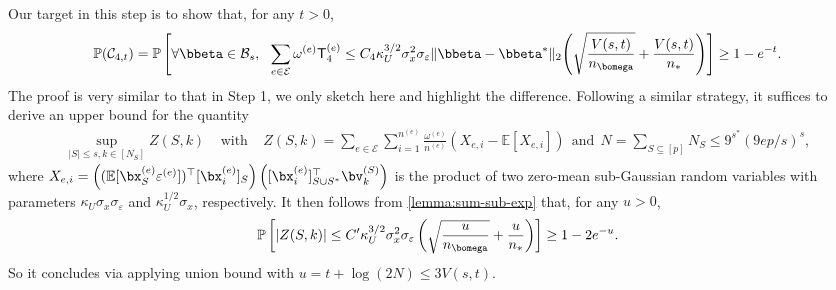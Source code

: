 \documentclass[10pt]{article}
\numberwithin{equation}{section}
\begin{document}
 Our target in this step is to show that, for any $t>0$,
\begin{align}
\label{eq:low-dim-id-bound4}
\mathbb{P}(\mathcal{C}_{4,t}) = \mathbb{P}\left[\forall \bbeta \in \mathcal{B}_s, ~~ \sum_{e\in \mathcal{E}} \omega^{(e)} \mathsf{T}_4^{(e)} \le C_4 \kappa_U^{3/2} \sigma_x^2\sigma_\varepsilon \|\bbeta - \bbeta^*\|_2\Bigg(\sqrt{\frac{V(s,t)}{n_{\bomega}}} + \frac{V(s,t)}{n_*}\Bigg)\right] \ge 1-e^{-t}.
\end{align} The proof is very similar to that in {\sc Step 1}, we only sketch here and highlight the difference. Following a similar strategy, it suffices to derive an upper bound for the quantity
\begin{align*}
    \sup_{|S| \le s, k\in [N_S]} Z(S,k) ~~~~~ \text{with} ~~~~~ Z(S,k) = \sum_{e\in \mathcal{E}} \sum_{i=1}^{n^{(e)}} \frac{\omega^{(e)}}{n^{(e)}} (X_{e,i} - \mathbb{E}[X_{e,i}]) ~~\text{and}~~ N=\sum_{S\subseteq [p]} N_S \le 9^{s^*}(9ep/s)^s,
\end{align*} where $X_{e,i}=\left((\mathbb{E}[\bx_S^{(e)} \varepsilon^{(e)}])^\top [\bx^{(e)}_i]_S\right) \left([\bx_i^{(e)}]_{S\cup S^*}^\top \bv_k^{(S)}\right)$ is the product of two zero-mean sub-Gaussian random variables with parameters $\kappa_U\sigma_x\sigma_\varepsilon$ and $\kappa_{U}^{1/2}\sigma_x$, respectively. It then follows from \cref{lemma:sum-sub-exp} that, for any $u>0$,
\begin{align*}
    \mathbb{P}\left[|Z(S,k)| \le C' \kappa_U^{3/2} \sigma_x^2\sigma_\varepsilon \left(\sqrt{\frac{u}{n_{\bomega}}} + \frac{u}{n_*}\right)\right] \ge 1-2e^{-u}.
\end{align*} So it concludes via applying union bound with $u = t + \log (2N) \le 3V(s,t)$.
\end{document}
